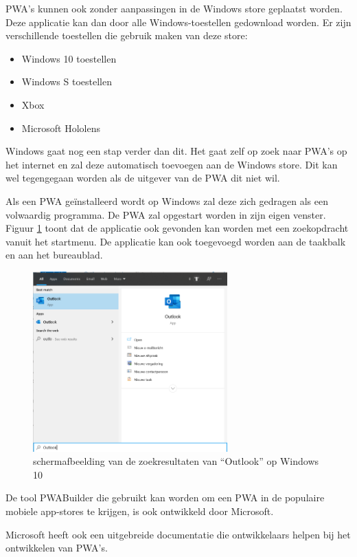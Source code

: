 		PWA's kunnen ook zonder aanpassingen in de Windows store geplaatst worden. Deze applicatie kan dan door alle Windows-toestellen gedownload worden. Er zijn verschillende toestellen die gebruik maken van deze store:
		\begin{itemize}
			\item	Windows 10 toestellen
			\item	Windows S toestellen
			\item	Xbox
			\item	Microsoft Hololens 
		\end{itemize}
		
		Windows gaat nog een stap verder dan dit. Het gaat zelf op zoek naar PWA's op het internet en zal deze automatisch toevoegen aan de Windows store. Dit kan wel tegengegaan worden als de uitgever van de PWA dit niet wil.
		\autocite{Gustafson2017} \autocite{Gustafson2017a}
		
		Als een PWA geïnstalleerd wordt op Windows zal deze zich gedragen als een volwaardig programma. De PWA zal opgestart worden in zijn eigen venster. Figuur \ref{fig:screenSearchWin} toont dat de applicatie ook gevonden kan worden met een zoekopdracht vanuit het startmenu. De applicatie kan ook toegevoegd worden aan de taakbalk en aan het bureaublad.
		
		\newpage
		\begin{figure}[H]
			\centering
			\includegraphics[width=75mm]{./img/Outlook_search_windows.png}
			\caption{schermafbeelding van de zoekresultaten van “Outlook” op Windows 10}
			\label{fig:screenSearchWin}
		\end{figure}
		
		
		De tool PWABuilder die gebruikt kan worden om een PWA in de populaire mobiele app-stores te krijgen, is ook ontwikkeld door Microsoft.
		\autocite{PWAbuilder2020}
		
		Microsoft heeft ook een uitgebreide documentatie die ontwikkelaars helpen bij het ontwikkelen van PWA's.
		\autocite{Microsoft2020b}
		
